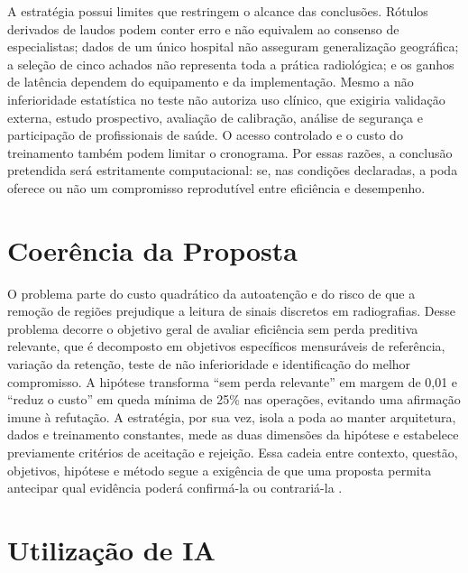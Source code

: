 \documentclass[10pt,a4paper]{extarticle}
\begin{document}
A estratégia possui limites que restringem o alcance das conclusões. Rótulos derivados de laudos podem conter erro e não equivalem ao consenso de especialistas; dados de um único hospital não asseguram generalização geográfica; a seleção de cinco achados não representa toda a prática radiológica; e os ganhos de latência dependem do equipamento e da implementação. Mesmo a não inferioridade estatística no teste não autoriza uso clínico, que exigiria validação externa, estudo prospectivo, avaliação de calibração, análise de segurança e participação de profissionais de saúde. O acesso controlado e o custo do treinamento também podem limitar o cronograma. Por essas razões, a conclusão pretendida será estritamente computacional: se, nas condições declaradas, a poda oferece ou não um compromisso reprodutível entre eficiência e desempenho.

\section{Coerência da Proposta}

O problema parte do custo quadrático da autoatenção e do risco de que a remoção de regiões prejudique a leitura de sinais discretos em radiografias. Desse problema decorre o objetivo geral de avaliar eficiência sem perda preditiva relevante, que é decomposto em objetivos específicos mensuráveis de referência, variação da retenção, teste de não inferioridade e identificação do melhor compromisso. A hipótese transforma \enquote{sem perda relevante} em margem de 0,01 e \enquote{reduz o custo} em queda mínima de 25\% nas operações, evitando uma afirmação imune à refutação. A estratégia, por sua vez, isola a poda ao manter arquitetura, dados e treinamento constantes, mede as duas dimensões da hipótese e estabelece previamente critérios de aceitação e rejeição. Essa cadeia entre contexto, questão, objetivos, hipótese e método segue a exigência de que uma proposta permita antecipar qual evidência poderá confirmá-la ou contrariá-la \citep[cap.~9]{wazlawick2020}.

\section{Utilização de IA}
\end{document}
